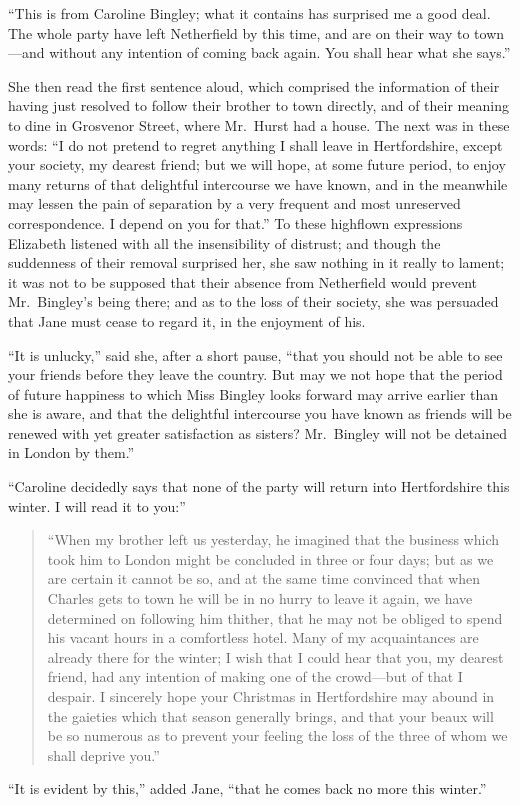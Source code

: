 \documentclass[12pt,english,oneside]{book}
\begin{document}
{}``This is from Caroline Bingley; what it contains has surprised
me a good deal. The whole party have left Netherfield by this time,
and are on their way to town\mbox{---}and without any intention of
coming back again. You shall hear what she says.''

She then read the first sentence aloud, which comprised the information
of their having just resolved to follow their brother to town directly,
and of their meaning to dine in Grosvenor Street, where Mr.\ Hurst
had a house. The next was in these words: {}``I do not pretend to
regret anything I shall leave in Hertfordshire, except your society,
my dearest friend; but we will hope, at some future period, to enjoy
many returns of that delightful intercourse we have known, and in
the meanwhile may lessen the pain of separation by a very frequent
and most unreserved correspondence. I depend on you for that.'' To
these highflown expressions Elizabeth listened with all the insensibility
of distrust; and though the suddenness of their removal surprised
her, she saw nothing in it really to lament; it was not to be supposed
that their absence from Netherfield would prevent Mr.\ Bingley's
being there; and as to the loss of their society, she was persuaded
that Jane must cease to regard it, in the enjoyment of his.

{}``It is unlucky,'' said she, after a short pause, {}``that you
should not be able to see your friends before they leave the country.
But may we not hope that the period of future happiness to which Miss
Bingley looks forward may arrive earlier than she is aware, and that
the delightful intercourse you have known as friends will be renewed
with yet greater satisfaction as sisters? Mr.\ Bingley will not be
detained in London by them.''

{}``Caroline decidedly says that none of the party will return into
Hertfordshire this winter. I will read it to you:''

\begin{quotation}
{}``When my brother left us yesterday, he imagined that the business
which took him to London might be concluded in three or four days;
but as we are certain it cannot be so, and at the same time convinced
that when Charles gets to town he will be in no hurry to leave it
again, we have determined on following him thither, that he may not
be obliged to spend his vacant hours in a comfortless hotel. Many
of my acquaintances are already there for the winter; I wish that
I could hear that you, my dearest friend, had any intention of making
one of the crowd\mbox{---}but of that I despair. I sincerely hope
your Christmas in Hertfordshire may abound in the gaieties which that
season generally brings, and that your beaux will be so numerous as
to prevent your feeling the loss of the three of whom we shall deprive
you.''
\end{quotation}
{}``It is evident by this,'' added Jane, {}``that he comes back
no more this winter.''
\end{document}
